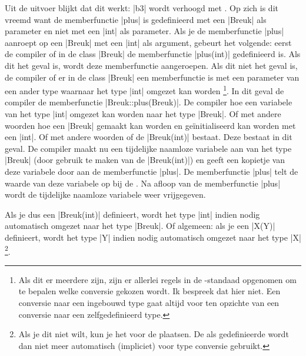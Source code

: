 \begin{cpplstShortInline}
Uit de uitvoer blijkt dat dit  werkt: |b3| wordt verhoogd met . 
Op zich is dit vreemd want de memberfunctie |plus| is gedefinieerd met een |Breuk| als parameter en niet met een |int| als parameter.
Als je de memberfunctie |plus| aanroept op een |Breuk| met een |int| als argument, gebeurt het volgende: eerst  de compiler of in de class |Breuk| de memberfunctie |plus(int)| gedefinieerd is. 
Als dit het geval is, wordt deze memberfunctie aangeroepen. 
Als dit niet het geval is,  de compiler of er in de class |Breuk| een memberfunctie is met een parameter van een ander type waarnaar het type |int| omgezet kan worden%
\footnote{%
    Als dit er meerdere zijn, zijn er allerlei regels in de \Cpp{}\hyp{}standaad opgenomen om te bepalen welke conversie gekozen wordt. 
    Ik bespreek dat hier niet. 
    Een conversie naar een ingebouwd type gaat altijd voor ten opzichte van een conversie naar een zelfgedefinieerd type.
}. 
In dit geval  de compiler de memberfunctie |Breuk::plus(Breuk)|. De compiler  hoe een variabele van het type |int| omgezet kan worden naar het type |Breuk|. Of met andere woorden hoe een |Breuk| gemaakt kan worden en geïnitialiseerd
kan worden met een |int|.
Of met andere woorden of de  |Breuk(int)| bestaat. 
Deze  bestaat in dit geval. 
De compiler maakt nu een tijdelijke naamloze variabele aan van het type |Breuk| (door gebruik te maken van de  |Breuk(int)|) en geeft een kopietje van deze variabele door aan de memberfunctie |plus|. 
De memberfunctie |plus| telt de waarde van deze variabele op bij de . 
Na afloop van de memberfunctie |plus| wordt de tijdelijke naamloze variabele weer vrijgegeven.

Als je dus een  |Breuk(int)| definieert, wordt het type |int| indien nodig automatisch omgezet naar het type |Breuk|. Of algemeen: als je een  |X(Y)| definieert, wordt het type |Y| indien nodig automatisch omgezet naar het type |X|%
\footnote{%
    Als je dit niet wilt, kun je het   voor de  plaatsen. 
    De als  gedefinieerde  wordt dan niet meer automatisch (impliciet) voor type conversie gebruikt.
}.


\end{cpplstShortInline}
